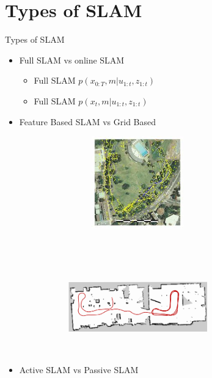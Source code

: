 \documentclass{beamer}
\begin{document}
\section{Types of SLAM}
\begin{frame}{Types of SLAM}
    \begin{itemize}
        \item Full SLAM vs online SLAM
        \begin{itemize}
            \item Full SLAM $p(x_{0:T},m|u_{1:t},z_{1:t})$
            \item Full SLAM $p(x_{t},m|u_{1:t},z_{1:t})$
        \end{itemize}
        \item Feature Based SLAM vs Grid Based
\begin{figure}
     \centering
        \begin{subfigure}[b]{0.4\textwidth}
        \hspace*{-10mm}
        \includegraphics[height = 40mm,width = 60mm]{feature_maps.jpeg}
        \end{subfigure}
    ~
        \begin{subfigure}[b]{0.4\textwidth}
        \centering
        \includegraphics[height = 40mm,width = 60mm]{gridMap.png}
        \end{subfigure}
    \end{figure}   

        \item Active SLAM vs Passive SLAM
    \end{itemize}
\end{frame}
\end{document}

